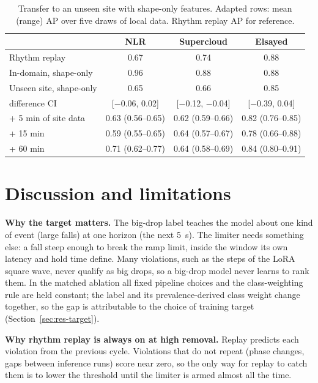 \documentclass[11pt]{article}
\begin{document}
\begin{table}[tb]
\centering
\caption{Transfer to an unseen site with shape-only features. Adapted rows: mean (range) AP over five
draws of local data. Rhythm replay AP for reference.}
\label{tab:transfer}
\small
\begin{tabular}{@{}lccc@{}}
\toprule
 & NLR & Supercloud & Elsayed \\
\midrule
Rhythm replay & 0.67 & 0.74 & 0.88 \\
In-domain, shape-only & 0.96 & 0.88 & 0.88 \\
Unseen site, shape-only & 0.65 & 0.66 & 0.85 \\
\quad difference CI & [$-$0.06, 0.02] & [$-$0.12, $-$0.04] & [$-$0.39, 0.04] \\
+ 5 min of site data & 0.63 (0.56--0.65) & 0.62 (0.59--0.66) & 0.82 (0.76--0.85) \\
+ 15 min & 0.59 (0.55--0.65) & 0.64 (0.57--0.67) & 0.78 (0.66--0.88) \\
+ 60 min & 0.71 (0.62--0.77) & 0.64 (0.58--0.69) & 0.84 (0.80--0.91) \\
\bottomrule
\end{tabular}
\end{table}

\section{Discussion and limitations}
\label{sec:limits}

\textbf{Why the target matters.} The big-drop label teaches the model about one kind of event (large
falls) at one horizon (the next 5~s). The limiter needs something else: a fall steep enough to break the
ramp limit, inside the window its own latency and hold time define. Many violations, such as the steps
of the LoRA square wave, never qualify as big drops, so a big-drop model never learns to rank them. In the
matched ablation all fixed pipeline choices and the class-weighting rule are held constant; the label and
its prevalence-derived class weight change together, so the gap is attributable to the choice of training
target (Section~\ref{sec:res-target}).

\textbf{Why rhythm replay is always on at high removal.} Replay predicts each violation from the previous
cycle. Violations that do not repeat (phase changes, gaps between inference runs) score near zero, so the
only way for replay to catch them is to lower the threshold until the limiter is armed almost all the
time.
\end{document}
